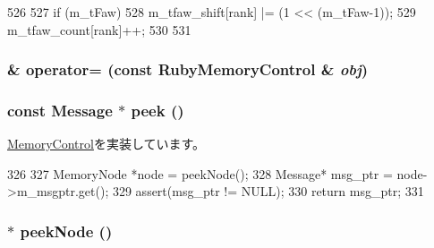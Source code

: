 \begin{DoxyCode}
526 {
527     if (m_tFaw) {
528         m_tfaw_shift[rank] |= (1 << (m_tFaw-1));
529         m_tfaw_count[rank]++;
530     }
531 }
\end{DoxyCode}
\hypertarget{classRubyMemoryControl_a625dea61d2ea0f477b1310e9307a33d6}{
\subsubsection[{operator=}]{\& operator= (const {\bf RubyMemoryControl} \& {\em obj})}}
\label{classRubyMemoryControl_a625dea61d2ea0f477b1310e9307a33d6}
\hypertarget{classRubyMemoryControl_ab635dc32ebecf260c15d8fbbbb9b21e0}{
\subsubsection[{peek}]{\setlength{\rightskip}{0pt plus 5cm}const {\bf Message} $\ast$ peek ()}}
\label{classRubyMemoryControl_ab635dc32ebecf260c15d8fbbbb9b21e0}


\hyperlink{classMemoryControl_a822b263266795dc49c26e24dc6eb4b54}{MemoryControl}を実装しています。


\begin{DoxyCode}
326 {
327     MemoryNode *node = peekNode();
328     Message* msg_ptr = node->m_msgptr.get();
329     assert(msg_ptr != NULL);
330     return msg_ptr;
331 }
\end{DoxyCode}
\hypertarget{classRubyMemoryControl_a8ffbfb520369710755a1260b8451de3d}{
\subsubsection[{peekNode}]{ $\ast$ peekNode ()}}
\label{classRubyMemoryControl_a8ffbfb520369710755a1260b8451de3d}


